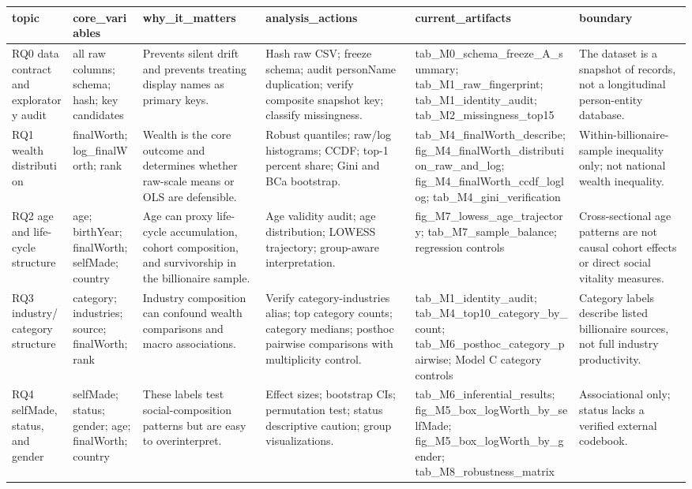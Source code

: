 \begin{tabular}{llllll}
\toprule
topic & core\_variables & why\_it\_matters & analysis\_actions & current\_artifacts & boundary \\
\midrule
RQ0 data contract and exploratory audit & all raw columns; schema; hash; key candidates & Prevents silent drift and prevents treating display names as primary keys. & Hash raw CSV; freeze schema; audit personName duplication; verify composite snapshot key; classify missingness. & tab\_M0\_schema\_freeze\_A\_summary; tab\_M1\_raw\_fingerprint; tab\_M1\_identity\_audit; tab\_M2\_missingness\_top15 & The dataset is a snapshot of records, not a longitudinal person-entity database. \\
RQ1 wealth distribution & finalWorth; log\_finalWorth; rank & Wealth is the core outcome and determines whether raw-scale means or OLS are defensible. & Robust quantiles; raw/log histograms; CCDF; top-1 percent share; Gini and BCa bootstrap. & tab\_M4\_finalWorth\_describe; fig\_M4\_finalWorth\_distribution\_raw\_and\_log; fig\_M4\_finalWorth\_ccdf\_loglog; tab\_M4\_gini\_verification & Within-billionaire-sample inequality only; not national wealth inequality. \\
RQ2 age and life-cycle structure & age; birthYear; finalWorth; selfMade; country & Age can proxy life-cycle accumulation, cohort composition, and survivorship in the billionaire sample. & Age validity audit; age distribution; LOWESS trajectory; group-aware interpretation. & fig\_M7\_lowess\_age\_trajectory; tab\_M7\_sample\_balance; regression controls & Cross-sectional age patterns are not causal cohort effects or direct social vitality measures. \\
RQ3 industry/category structure & category; industries; source; finalWorth; rank & Industry composition can confound wealth comparisons and macro associations. & Verify category-industries alias; top category counts; category medians; posthoc pairwise comparisons with multiplicity control. & tab\_M1\_identity\_audit; tab\_M4\_top10\_category\_by\_count; tab\_M6\_posthoc\_category\_pairwise; Model C category controls & Category labels describe listed billionaire sources, not full industry productivity. \\
RQ4 selfMade, status, and gender & selfMade; status; gender; age; finalWorth; country & These labels test social-composition patterns but are easy to overinterpret. & Effect sizes; bootstrap CIs; permutation test; status descriptive caution; group visualizations. & tab\_M6\_inferential\_results; fig\_M5\_box\_logWorth\_by\_selfMade; fig\_M5\_box\_logWorth\_by\_gender; tab\_M8\_robustness\_matrix & Associational only; status lacks a verified external codebook. \\

\end{tabular}
